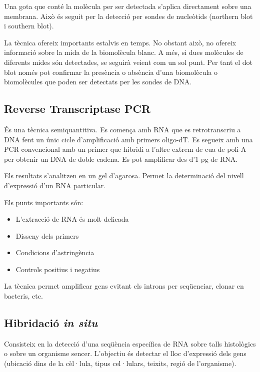 Una gota que conté la molècula per ser detectada s'aplica directament
sobre una membrana. Això és seguit per la detecció per sondes de
nucleòtids (northern blot i southern blot).

La tècnica ofereix importants estalvis en temps. No obstant això, no
ofereix informació sobre la mida de la biomolècula blanc. A més, si
dues molècules de diferents mides són detectades, se seguirà veient
com un sol punt. Per tant el dot blot només pot confirmar la presència
o absència d'una biomolècula o biomolècules que poden ser detectats
per les sondes de DNA.

\subsection{Reverse Transcriptase PCR}
\label{sec:reverse-transcr-pcr}
És una tècnica semiquantitiva. Es comença amb RNA que es retrotranscriu a
DNA fent un únic cicle d'amplificació amb primers oligo-dT. Es
segueix amb una PCR convencional amb un primer que hibridi a l'altre
extrem de cua de poli-A per obtenir un DNA de doble cadena. Es pot
amplificar des d'1 pg de RNA.

Els resultats s'analitzen en un gel d'agarosa. Permet la determinació
del nivell d'expressió d'un RNA particular.

Els punts importants són:
\begin{itemize}
\item L'extracció de RNA és molt delicada
\item Disseny dels primers
\item Condicions d'astringència
\item Controls positius i negatius
\end{itemize}

La tècnica permet amplificar gens evitant els introns per seqüenciar,
clonar en bacteris, etc.

\subsection{Hibridació \textit{in situ}}
\label{sec:hibridacio-situ}
Consisteix en la detecció d'una seqüència específica de RNA sobre
talls histològics o sobre un organisme sencer. L'objectiu és detectar
el lloc d'expressió dels gens (ubicació dins de la cèl·lula, tipus
cel·lulars, teixits, regió de l'organisme).

